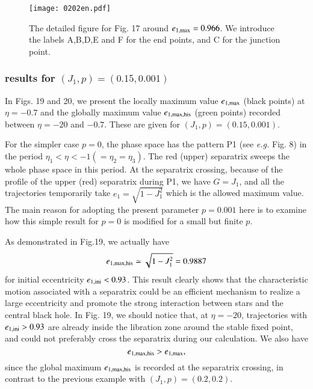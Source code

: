 \documentclass[useAMS,usenatbib,twocolumn]{mn2e}
\newcommand{\beq}{\begin{equation}}
\newcommand{\eeq}{\end{equation}}
\begin{document}
\begin{figure}
\begin{center}
\texttt{[image: 0202en.pdf]}
\caption{The detailed  figure for Fig. 17 around $e_{\rm 1,max}=0.966$. We introduce the labels A,B,D,E and F for the end points, and C for the junction point. }
\label{fig:18}
\end{center}
\end{figure}




\subsubsection{results for $(J_1,p)=(0.15,0.001)$}


In Figs. 19 and 20, we present the locally maximum value $e_{\rm 1,max}$ (black points) at $\eta=-0.7$ and   the globally maximum value $e_{\rm 1,max,his}$ (green points) recorded between $\eta=-20$ and $-0.7$. These are given for $(J_1,p)=(0.15,0.001)$.

For the simpler case $p=0$,  the phase space has the pattern P1 (see {\it e.g.} Fig. 8) in the period $\eta_1<\eta<-1(=\eta_2=\eta_3)$.  The red (upper) separatrix sweeps the whole phase space  in this period. At the separatrix crossing, because of  the profile of the  upper (red) separatrix during P1,  we have $G=J_1$, and all the trajectories temporarily take  $e_1=\sqrt{1-J_1^2}$ which is the allowed maximum value.  The main reason for adopting the present parameter $p=0.001$ here is to examine how this simple result for $p=0$ is modified for a small but finite $p$. 


As demonstrated in Fig.19, we actually have
\beq
e_{\rm 1,max,his}\simeq \sqrt{1-J_1^2}=0.9887 
\eeq
for initial eccentricity $ e_{\rm 1,ini}<0.93$.  This result clearly shows that the characteristic motion associated with a separatrix could be an efficient mechanism to realize a large eccentricity and promote the strong interaction between stars and the central black hole. 
In Fig. 19, we should notice that, at $\eta=-20$,  trajectories with  $ e_{\rm 1,ini}>0.93$ are already inside the libration zone around the stable fixed point, and could not preferably cross the separatrix during our calculation.  We also have
\beq
e_{\rm 1,max,his}> e_{\rm 1,max},
\eeq
since the global maximum $e_{\rm 1,max,his}$ is recorded at the separatrix crossing, in contrast to the previous example with $(J_1,p)=(0.2,0.2)$. 
\end{document}
